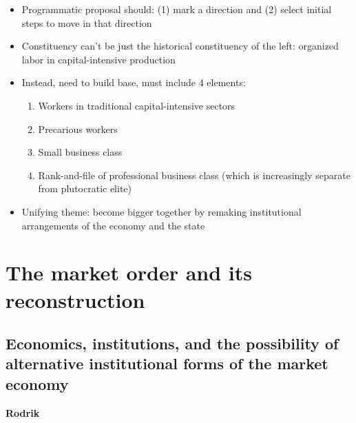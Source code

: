 \begin{itemize}
\tightlist
\item
  Programmatic proposal should: (1) mark a direction and (2) select
  initial steps to move in that direction
\item
  Constituency can't be just the historical constituency of the left:
  organized labor in capital-intensive production
\item
  Instead, need to build base, must include 4 elements:

  \begin{enumerate}
  \def\labelenumi{\arabic{enumi}.}
  \tightlist
  \item
    Workers in traditional capital-intensive sectors
  \item
    Precarious workers
  \item
    Small business class
  \item
    Rank-and-file of professional business class (which is increasingly
    separate from plutocratic elite)
  \end{enumerate}
\item
  Unifying theme: become bigger together by remaking institutional
  arrangements of the economy and the state
\end{itemize}

\hypertarget{the-market-order-and-its-reconstruction}{%
\section{The market order and its
reconstruction}\label{the-market-order-and-its-reconstruction}}

\hypertarget{economics-institutions-and-the-possibility-of-alternative-institutional-forms-of-the-market-economy}{%
\subsection{Economics, institutions, and the possibility of alternative
institutional forms of the market
economy}\label{economics-institutions-and-the-possibility-of-alternative-institutional-forms-of-the-market-economy}}

\textbf{Rodrik}


